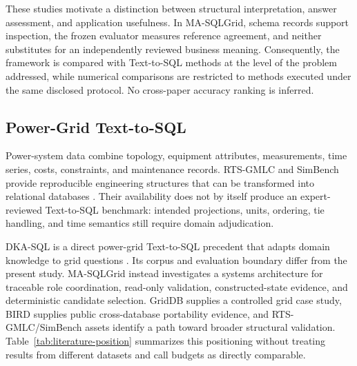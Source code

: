 \documentclass[information,article,submit,moreauthors]{Definitions/mdpi}
\newcommand{\masql}{MA-SQLGrid}
\begin{document}
These studies motivate a distinction between structural interpretation, answer assessment, and application usefulness. In \masql{}, schema records support inspection, the frozen evaluator measures reference agreement, and neither substitutes for an independently reviewed business meaning. Consequently, the framework is compared with Text-to-SQL methods at the level of the problem addressed, while numerical comparisons are restricted to methods executed under the same disclosed protocol. No cross-paper accuracy ranking is inferred.

\subsection{Power-Grid Text-to-SQL}

Power-system data combine topology, equipment attributes, measurements, time series, costs, constraints, and maintenance records. RTS-GMLC and SimBench provide reproducible engineering structures that can be transformed into relational databases \cite{barrows2020rts,meinecke2020simbench}. Their availability does not by itself produce an expert-reviewed Text-to-SQL benchmark: intended projections, units, ordering, tie handling, and time semantics still require domain adjudication.

DKA-SQL is a direct power-grid Text-to-SQL precedent that adapts domain knowledge to grid questions \cite{bian2025dkasql}. Its corpus and evaluation boundary differ from the present study. \masql{} instead investigates a systems architecture for traceable role coordination, read-only validation, constructed-state evidence, and deterministic candidate selection. GridDB supplies a controlled grid case study, BIRD supplies public cross-database portability evidence, and RTS-GMLC/SimBench assets identify a path toward broader structural validation. Table~\ref{tab:literature-position} summarizes this positioning without treating results from different datasets and call budgets as directly comparable.
\end{document}

